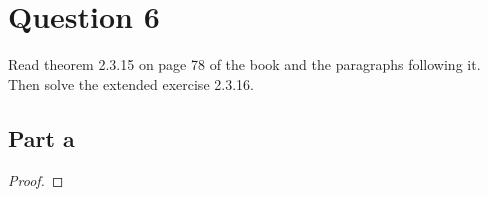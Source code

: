 \section{Question 6}

\begin{question}
    Read theorem 2.3.15 on page 78 of the book and the paragraphs following it. Then solve the extended exercise 2.3.16.
\end{question}

\subsection{Part a}

\begin{answer}
    \begin{proof}
        
    \end{proof}
\end{answer}